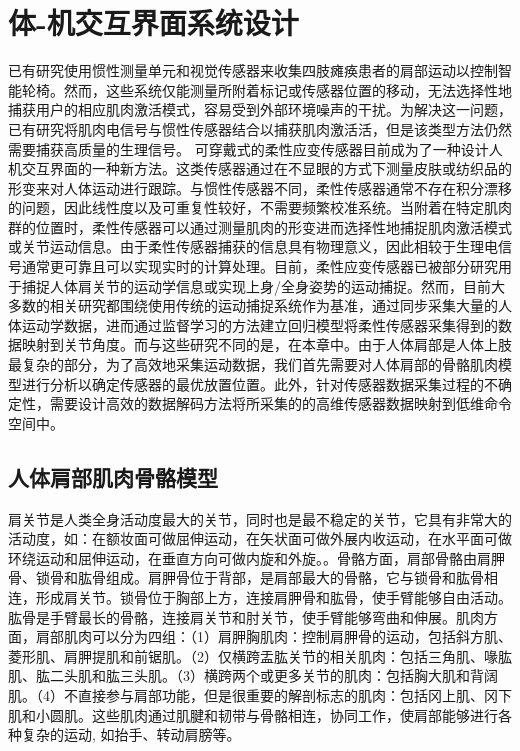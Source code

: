 \section{体-机交互界面系统设计} 
已有研究使用惯性测量单元和视觉传感器来收集四肢瘫痪患者的肩部运动以控制智能轮椅\cite{thorpUpperBodyBasedPower2016d,seanez-gonzalezCursorControlKalman2014}。然而，这些系统仅能测量所附着标记或传感器位置的移动，无法选择性地捕获用户的相应肌肉激活模式，容易受到外部环境噪声的干扰。为解决这一问题，已有研究将肌肉电信号与惯性传感器结合以捕获肌肉激活活\cite{rizzoglioHybridBodyMachineInterface2020}，但是该类型方法仍然需要捕获高质量的生理信号。
可穿戴式的柔性应变传感器目前成为了一种设计人机交互界面的一种新方法\cite{dongStretchableHumanMachine2020}。这类传感器通过在不显眼的方式下测量皮肤或纺织品的形变来对人体运动进行跟踪。与惯性传感器不同，柔性传感器通常不存在积分漂移的问题，因此线性度以及可重复性较好，不需要频繁校准系统。当附着在特定肌肉群的位置时，柔性传感器可以通过测量肌肉的形变进而选择性地捕捉肌肉激活模式或关节运动信息。由于柔性传感器捕获的信息具有物理意义，因此相较于生理电信号通常更可靠且可以实现实时的计算处理。目前，柔性应变传感器已被部分研究用于捕捉人体肩关节的运动学信息\cite{jinSoftSensingShirt2020,leePrintableSkinAdhesive2016,samper-escuderoEfficientMultiaxialShoulderMotion2020}或实现上身/全身姿势的运动捕捉\cite{contreras-gonzalezEfficientUpperLimb2020,ogataEstimatingMovementsHuman2019,kimDeepFullBodyMotion2019}。然而，目前大多数的相关研究都围绕使用传统的运动捕捉系统作为基准，通过同步采集大量的人体运动学数据，进而通过监督学习的方法建立回归模型将柔性传感器采集得到的数据映射到关节角度。而与这些研究不同的是，在本章中。由于人体肩部是人体上肢最复杂的部分，为了高效地采集运动数据，我们首先需要对人体肩部的骨骼肌肉模型进行分析以确定传感器的最优放置位置。此外，针对传感器数据采集过程的不确定性，需要设计高效的数据解码方法将所采集的的高维传感器数据映射到低维命令空间中。  

\subsection{人体肩部肌肉骨骼模型}
肩关节是人类全身活动度最大的关节，同时也是最不稳定的关节，它具有非常大的活动度，如：在额妆面可做屈伸运动，在矢状面可做外展内收运动，在水平面可做环绕运动和屈伸运动，在垂直方向可做内旋和外旋。。骨骼方面，肩部骨骼由肩胛骨、锁骨和肱骨组成。肩胛骨位于背部，是肩部最大的骨骼，它与锁骨和肱骨相连，形成肩关节。锁骨位于胸部上方，连接肩胛骨和肱骨，使手臂能够自由活动。肱骨是手臂最长的骨骼，连接肩关节和肘关节，使手臂能够弯曲和伸展。肌肉方面，肩部肌肉可以分为四组：（1）肩胛胸肌肉：控制肩胛骨的运动，包括斜方肌、菱形肌、肩胛提肌和前锯肌。（2）仅横跨盂肱关节的相关肌肉：包括三角肌、喙肱肌、肱二头肌和肱三头肌。（3）横跨两个或更多关节的肌肉：包括胸大肌和背阔肌。（4）不直接参与肩部功能，但是很重要的解剖标志的肌肉：包括冈上肌、冈下肌和小圆肌。这些肌肉通过肌腱和韧带与骨骼相连，协同工作，使肩部能够进行各种复杂的运动, 如抬手、转动肩膀等\cite{terryFunctionalAnatomyShoulder2000}。

